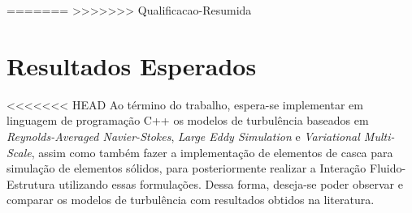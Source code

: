 \documentclass[_ArquivoPrincipal.tex]{subfiles}
\begin{document}
=======
>>>>>>> Qualificacao-Resumida
\chapter{Resultados Esperados} \label{ResultadosEsperados}

<<<<<<< HEAD
Ao término do trabalho, espera-se implementar em linguagem de programação C++ os modelos de turbulência baseados em \textit{Reynolds-Averaged Navier-Stokes}, \textit{Large Eddy Simulation} e \textit{Variational Multi-Scale}, assim como também fazer a implementação de elementos de casca para simulação de elementos sólidos, para posteriormente realizar a Interação Fluido-Estrutura utilizando essas formulações. Dessa forma, deseja-se poder observar e comparar os modelos de turbulência com resultados obtidos na literatura.
\end{document}
